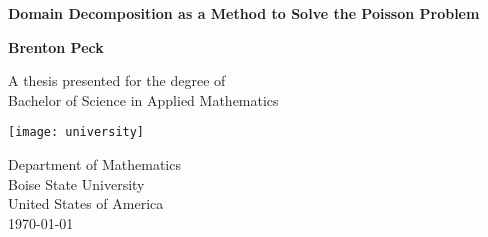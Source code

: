 \begin{titlepage}
    \begin{center}
        \vspace*{1cm}
        
	\Huge
        \textbf{Domain Decomposition as a Method to Solve the Poisson Problem}
        
        \vspace{0.5cm}

        
        \vspace{1.5cm}
        
        \textbf{Brenton Peck}
        
        \vfill
        
        A thesis presented for the degree of\\
        Bachelor of Science in Applied Mathematics
        
        \vspace{0.8cm}
        
        \texttt{[image: university]}
        
	\Large
        Department of Mathematics\\
        Boise State University\\
        United States of America\\
        \today
        
    \end{center}
\end{titlepage}
